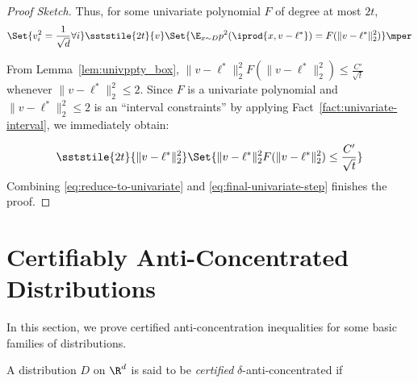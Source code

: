 \begin{proof}[Proof Sketch]
Thus,  for some univariate polynomial $F$ of degree at most $2t$,
\begin{equation} \label{eq:reduce-to-univariate}
\Set{v_i^2 = \frac{1}{\sqrt{d}} \forall i} \sststile{2t}{v} \Set{\E_{x \sim D} p^2(\iprod{x,v-\ell^*}) = F(\|v-\ell^*\|_2^2)} \mper
\end{equation}

From Lemma~\ref{lem:univppty_box}, $\|v-\ell^*\|_2^2 F(\|v-\ell^*\|_2^2) \leq \frac{C'}{\sqrt{t}}$ whenever $\|v-\ell^*\|_2^2 \leq 2$. Since $F$ is a univariate polynomial and $\|v-\ell^*\|_2^2\leq 2$ is an ``interval constraints'' by applying Fact~\ref{fact:univariate-interval}, we immediately obtain:

\begin{equation} \label{eq:final-univariate-step}
\sststile{2t}{\|v-\ell^*\|_2^2} \Set{\|v-\ell^*\|_2^2 F(\|v-\ell^*\|_2^2) \leq \frac{C'}{\sqrt{t}}} 
\end{equation}
Combining \eqref{eq:reduce-to-univariate} and \eqref{eq:final-univariate-step} finishes the proof. 




\end{proof}

\section{Certifiably Anti-Concentrated Distributions} \label{sec:certified-anti-concentration}
In this section, we prove certified anti-concentration inequalities for some basic families of distributions. 

\begin{definition}
A distribution $D$ on $\R^d$ is said to be \emph{certified} $\delta$-anti-concentrated if 
\end{definition}